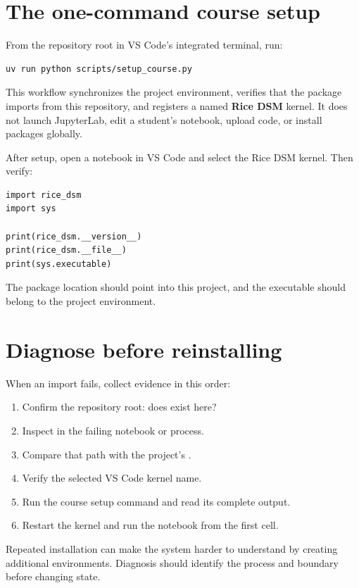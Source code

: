 \section{The one-command course setup}

From the repository root in VS Code's integrated terminal, run:

\begin{lstlisting}[language=bash,numbers=none]
uv run python scripts/setup_course.py
\end{lstlisting}

This workflow synchronizes the project environment, verifies that the
 package imports from this repository, and registers a named
\textbf{Rice DSM} kernel. It does not launch JupyterLab, edit a student's
notebook, upload code, or install packages globally.

After setup, open a notebook in VS Code and select the Rice DSM kernel. Then
verify:

\begin{lstlisting}
import rice_dsm
import sys

print(rice_dsm.__version__)
print(rice_dsm.__file__)
print(sys.executable)
\end{lstlisting}

The package location should point into this project, and the executable should
belong to the project environment.

\section{Diagnose before reinstalling}

When an import fails, collect evidence in this order:

\begin{enumerate}
  \item Confirm the repository root: does  exist here?
  \item Inspect  in the failing notebook or process.
  \item Compare that path with the project's .
  \item Verify the selected VS Code kernel name.
  \item Run the course setup command and read its complete output.
  \item Restart the kernel and run the notebook from the first cell.
\end{enumerate}

Repeated installation can make the system harder to understand by creating
additional environments. Diagnosis should identify the process and boundary
before changing state.

